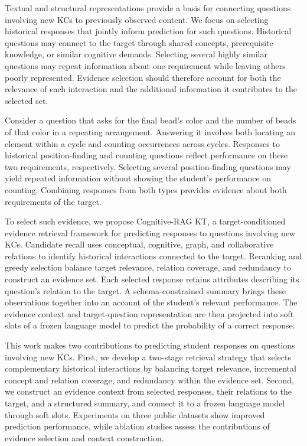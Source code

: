 \documentclass{llncs}
\begin{document}
Textual and structural representations provide a basis for connecting questions involving new KCs to previously observed content. We focus on selecting historical responses that jointly inform prediction for such questions. Historical questions may connect to the target through shared concepts, prerequisite knowledge, or similar cognitive demands. Selecting several highly similar questions may repeat information about one requirement while leaving others poorly represented. Evidence selection should therefore account for both the relevance of each interaction and the additional information it contributes to the selected set.

Consider a question that asks for the final bead's color and the number of beads of that color in a repeating arrangement. Answering it involves both locating an element within a cycle and counting occurrences across cycles. Responses to historical position-finding and counting questions reflect performance on these two requirements, respectively. Selecting several position-finding questions may yield repeated information without showing the student's performance on counting. Combining responses from both types provides evidence about both requirements of the target.

To select such evidence, we propose Cognitive-RAG KT, a target-conditioned evidence retrieval framework for predicting responses to questions involving new KCs. Candidate recall uses conceptual, cognitive, graph, and collaborative relations to identify historical interactions connected to the target. Reranking and greedy selection balance target relevance, relation coverage, and redundancy to construct an evidence set. Each selected response retains attributes describing its question's relation to the target. A schema-constrained summary brings these observations together into an account of the student's relevant performance. The evidence context and target-question representation are then projected into soft slots of a frozen language model to predict the probability of a correct response.

This work makes two contributions to predicting student responses on questions involving new KCs. First, we develop a two-stage retrieval strategy that selects complementary historical interactions by balancing target relevance, incremental concept and relation coverage, and redundancy within the evidence set. Second, we construct an evidence context from selected responses, their relations to the target, and a structured summary, and connect it to a frozen language model through soft slots. Experiments on three public datasets show improved prediction performance, while ablation studies assess the contributions of evidence selection and context construction.
\end{document}
